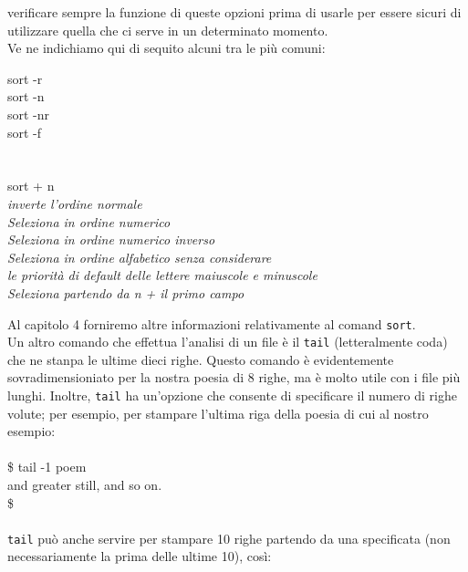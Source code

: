 verificare sempre la funzione di queste opzioni prima di usarle per essere sicuri di 
utilizzare quella che ci serve in un determinato momento.\\
Ve ne indichiamo qui di sequito alcuni tra le più comuni:
\begin{multicols}{2}
	sort -r\\
	sort -n\\
	sort -nr\\
	sort -f\\\\\\
	sort + n \\
	{\it inverte l'ordine normale}\\
	\textit{Seleziona in ordine numerico}\\
	\textit{Seleziona in ordine numerico inverso} \\
	\textit{Seleziona in ordine alfabetico senza considerare}\\
	\textit{le priorità di default delle lettere maiuscole e minuscole}\\
	\textit{Seleziona partendo da n + il primo campo}
\end{multicols}
Al capitolo 4 forniremo altre informazioni relativamente al comand {\tt sort}.\\
Un altro comando che effettua l'analisi di un file è il {\tt tail} (letteralmente coda) che ne stanpa le ultime dieci righe.  Questo comando è evidentemente sovradimensioniato per la nostra poesia di 8 righe, ma è molto utile con i file più lunghi. Inoltre, {\tt tail} ha un'opzione che consente di specificare il numero di righe volute; per esempio, per stampare l'ultima riga della poesia di cui al nostro esempio:\\\\
\$ tail -1 poem\\
and greater still, and so on.\\
\$\\\\
{\tt tail} può anche servire per stampare 10 righe partendo da una specificata (non necessariamente la prima delle ultime 10), così:\\\\

